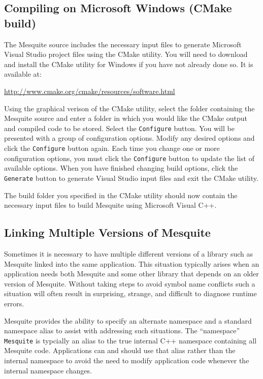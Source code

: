 \subsection{Compiling on Microsoft Windows (CMake build)}

The Mesquite source includes the necessary input files to generate Microsoft
Visual Studio project files using the CMake utility.  You will need to 
download and install the CMake utility for Windows if you have not already done so.  It is available at:
\begin{center}
 \url{http://www.cmake.org/cmake/resources/software.html}
\end{center}

Using the graphical verison of the CMake utility, select the folder containing the Mesquite source and enter a folder in which you would like the CMake output and compiled code to be stored.  Select the \texttt{Configure} button.  You will be presented with a group of configuration options.  Modify any desired options and click the \texttt{Configure} button again.  Each time you change one or more configuration options, you must click the \texttt{Configure} button to update the list of available options.  When you have finished changing build options, click the \texttt{Generate} button to generate Visual Studio input files and exit the CMake utility.

The build folder you specified in the CMake utility should now contain the necessary input files to build Mesquite using Microsoft Visual C++.  

\subsection{Linking Multiple Versions of Mesquite \label{namespace_mangling} }

Sometimes it is necessary to have multiple different versions of a library 
such as Mesquite linked into the same application.  This situation typically
arises when an application needs both Mesquite and some other library that depends on an older version of Mesquite.  Without taking steps to avoid symbol
name conflicts such a situation will often result in surprising, strange, and
difficult to diagnose runtime errors.  

Mesquite provides the ability to specify an alternate namespace and a standard
namespace alias to assist with addressing such situations.  The ``namespace'' \texttt{Mesquite} is typcially an alias to the true internal C++ namespace containing all Mesquite code.  Applications can and should use that alias rather than the internal namespace to avoid the need to modify application code whenever the internal namespace changes.  

